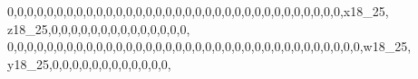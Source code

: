\documentclass[]{article}
\newenvironment{Shaded}{\begin{snugshade}}{\end{snugshade}}
\newcommand{\DecValTok}[1]{\textcolor[rgb]{0.00,0.00,0.81}{#1}}
\newcommand{\NormalTok}[1]{#1}
\begin{document}
\begin{Shaded}
\begin{Highlighting}[]
\DecValTok{0}\NormalTok{,}\DecValTok{0}\NormalTok{,}\DecValTok{0}\NormalTok{,}\DecValTok{0}\NormalTok{,}\DecValTok{0}\NormalTok{,}\DecValTok{0}\NormalTok{,}\DecValTok{0}\NormalTok{,}\DecValTok{0}\NormalTok{,}\DecValTok{0}\NormalTok{,}\DecValTok{0}\NormalTok{,}\DecValTok{0}\NormalTok{,}\DecValTok{0}\NormalTok{,}\DecValTok{0}\NormalTok{,}\DecValTok{0}\NormalTok{,}\DecValTok{0}\NormalTok{,}\DecValTok{0}\NormalTok{,}\DecValTok{0}\NormalTok{,}\DecValTok{0}\NormalTok{,}\DecValTok{0}\NormalTok{,}\DecValTok{0}\NormalTok{,}\DecValTok{0}\NormalTok{,}\DecValTok{0}\NormalTok{,}\DecValTok{0}\NormalTok{,}\DecValTok{0}\NormalTok{,}\DecValTok{0}\NormalTok{,}\DecValTok{0}\NormalTok{,}\DecValTok{0}\NormalTok{,}\DecValTok{0}\NormalTok{,}\DecValTok{0}\NormalTok{,}\DecValTok{0}\NormalTok{,}\DecValTok{0}\NormalTok{,}\DecValTok{0}\NormalTok{,}\DecValTok{0}\NormalTok{,}\DecValTok{0}\NormalTok{,x18_}\DecValTok{25}\NormalTok{, z18_}\DecValTok{25}\NormalTok{,}\DecValTok{0}\NormalTok{,}\DecValTok{0}\NormalTok{,}\DecValTok{0}\NormalTok{,}\DecValTok{0}\NormalTok{,}\DecValTok{0}\NormalTok{,}\DecValTok{0}\NormalTok{,}\DecValTok{0}\NormalTok{,}\DecValTok{0}\NormalTok{,}\DecValTok{0}\NormalTok{,}\DecValTok{0}\NormalTok{,}\DecValTok{0}\NormalTok{,}\DecValTok{0}\NormalTok{,}\DecValTok{0}\NormalTok{,}\DecValTok{0}\NormalTok{,}
\DecValTok{0}\NormalTok{,}\DecValTok{0}\NormalTok{,}\DecValTok{0}\NormalTok{,}\DecValTok{0}\NormalTok{,}\DecValTok{0}\NormalTok{,}\DecValTok{0}\NormalTok{,}\DecValTok{0}\NormalTok{,}\DecValTok{0}\NormalTok{,}\DecValTok{0}\NormalTok{,}\DecValTok{0}\NormalTok{,}\DecValTok{0}\NormalTok{,}\DecValTok{0}\NormalTok{,}\DecValTok{0}\NormalTok{,}\DecValTok{0}\NormalTok{,}\DecValTok{0}\NormalTok{,}\DecValTok{0}\NormalTok{,}\DecValTok{0}\NormalTok{,}\DecValTok{0}\NormalTok{,}\DecValTok{0}\NormalTok{,}\DecValTok{0}\NormalTok{,}\DecValTok{0}\NormalTok{,}\DecValTok{0}\NormalTok{,}\DecValTok{0}\NormalTok{,}\DecValTok{0}\NormalTok{,}\DecValTok{0}\NormalTok{,}\DecValTok{0}\NormalTok{,}\DecValTok{0}\NormalTok{,}\DecValTok{0}\NormalTok{,}\DecValTok{0}\NormalTok{,}\DecValTok{0}\NormalTok{,}\DecValTok{0}\NormalTok{,}\DecValTok{0}\NormalTok{,}\DecValTok{0}\NormalTok{,}\DecValTok{0}\NormalTok{,}\DecValTok{0}\NormalTok{,}\DecValTok{0}\NormalTok{,w18_}\DecValTok{25}\NormalTok{, y18_}\DecValTok{25}\NormalTok{,}\DecValTok{0}\NormalTok{,}\DecValTok{0}\NormalTok{,}\DecValTok{0}\NormalTok{,}\DecValTok{0}\NormalTok{,}\DecValTok{0}\NormalTok{,}\DecValTok{0}\NormalTok{,}\DecValTok{0}\NormalTok{,}\DecValTok{0}\NormalTok{,}\DecValTok{0}\NormalTok{,}\DecValTok{0}\NormalTok{,}\DecValTok{0}\NormalTok{,}\DecValTok{0}\NormalTok{,}

\end{Highlighting}
\end{Shaded}
\end{document}
